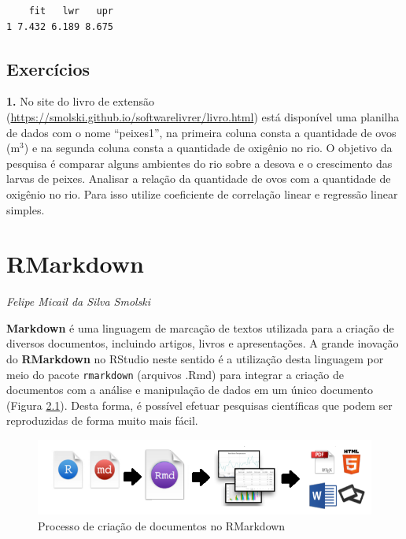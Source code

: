 \documentclass[12pt,brazil,oneside]{book}
\begin{document}
\begin{verbatim}
    fit   lwr   upr
1 7.432 6.189 8.675
\end{verbatim}

\hypertarget{exercicios-1}{%
\section{Exercícios}\label{exercicios-1}}

\textbf{1.} No site do livro de extensão (\url{https://smolski.github.io/softwarelivrer/livro.html}) está disponível uma planilha de dados com o nome ``peixes1'', na primeira coluna consta a quantidade de ovos (m\(^3\)) e na segunda coluna consta a quantidade de oxigênio no rio. O objetivo da pesquisa é comparar alguns ambientes do rio sobre a desova e o crescimento das larvas de peixes. Analisar a relação da quantidade de ovos com a quantidade de oxigênio no rio. Para isso utilize coeficiente de correlação linear e regressão linear simples.

\hypertarget{rmark}{%
\chapter{RMarkdown}\label{rmark}}

\emph{Felipe Micail da Silva Smolski}

\begin{flushright}
\emph{}
\end{flushright}

\textbf{Markdown} é uma linguagem de marcação de textos utilizada para a criação de diversos documentos, incluindo artigos, livros e apresentações. A grande inovação do \textbf{RMarkdown} no RStudio neste sentido é a utilização desta linguagem por meio do pacote \texttt{rmarkdown} (arquivos .Rmd) para integrar a criação de documentos com a análise e manipulação de dados em um único documento (Figura \ref{fig:rmark}). Desta forma, é possível efetuar pesquisas científicas que podem ser reproduzidas de forma muito mais fácil.

\begin{figure}[H]

{\centering \includegraphics[width=0.8\linewidth]{rmarkdown} 

}

\caption{Processo de criação de documentos no RMarkdown}\label{fig:rmark}
\end{figure}
\end{document}

